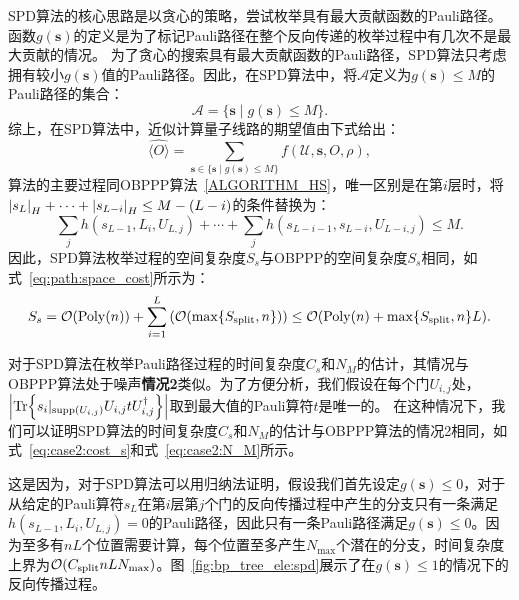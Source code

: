 SPD算法的核心思路是以贪心的策略，尝试枚举具有最大贡献函数的Pauli路径。函数$g(\bm{s})$的定义是为了标记Pauli路径在整个反向传递的枚举过程中有几次不是最大贡献的情况。
为了贪心的搜索具有最大贡献函数的Pauli路径，SPD算法只考虑拥有较小$g(\bm{s})$值的Pauli路径。因此，在SPD算法中，将$\mathcal{A}$定义为$g(\bm{s})\leq M$的Pauli路径的集合：
\begin{equation}
    \mathcal{A}=\{\bm{s}\mid g(\bm{s})\leq M\}.
\end{equation}
综上，在SPD算法中，近似计算量子线路的期望值由下式给出：
\begin{equation}\label{eq:spd:approximation}
    \widehat{\langle O \rangle} = \sum_{\bm{s}\in \{\bm{s}\mid g(\bm{s})\leq M\}} f(\mathcal{U},\bm{s},O,\rho),
\end{equation}
算法的主要过程同OBPPP算法~\ref{ALGORITHM_HS}，唯一区别是在第$i$层时，将$\abs{s_{L}}_H+\cdots+\abs{s_{L-i}}_H\leq M-(L-i)$的条件替换为：
\begin{equation}
    \sum_{j} h(s_{L-1},L_i,U_{L,j})+\cdots+\sum_{j} h(s_{L-i-1},s_{L-i},U_{L-i,j})\leq M.
\end{equation}
因此，SPD算法枚举过程的空间复杂度$S_s$与OBPPP的空间复杂度$S_s$相同，如式~\eqref{eq:path:space_cost}所示为：
\begin{equation}\label{eq:spd:space_cost}
    S_s=\order{\mathrm{Poly}(n)}+\sum_{i=1}^{L}\left(\order{\max\{S_{\text{split}},n\}}\right)\leq\order{\mathrm{Poly}(n)+\max\{S_{\text{split}},n\}L}.
\end{equation}


对于SPD算法在枚举Pauli路径过程的时间复杂度$C_s$和$N_M$的估计，其情况与OBPPP算法处于噪声\textbf{情况2}类似。为了方便分析，我们假设在每个门$U_{i,j}$处，$\abs{\Tr{s_i|_{\text{supp}(U_{i,j})} U_{i,j} t U_{i,j}^\dagger}}$取到最大值的Pauli算符$t$是唯一的。
在这种情况下，我们可以证明SPD算法的时间复杂度$C_s$和$N_M$的估计与OBPPP算法的情况2相同，如式~\eqref{eq:case2:cost_s}和式~\eqref{eq:case2:N_M}所示。

这是因为，对于SPD算法可以用归纳法证明，假设我们首先设定$g(\bm{s})\leq 0$，对于从给定的Pauli算符$s_L$在第$i$层第$j$个门的反向传播过程中产生的分支只有一条满足$h(s_{L-1},L_i,U_{L,j})=0$的Pauli路径，因此只有一条Pauli路径满足$g(\bm{s})\leq 0$。因为至多有$nL$个位置需要计算，每个位置至多产生$N_{\max}$个潜在的分支，时间复杂度上界为$\order{C_{\text{split}}nLN_{\text{max}}}$。图~\ref{fig:bp_tree_ele:spd}展示了在$g(\bm{s})\leq 1$的情况下的反向传播过程。

